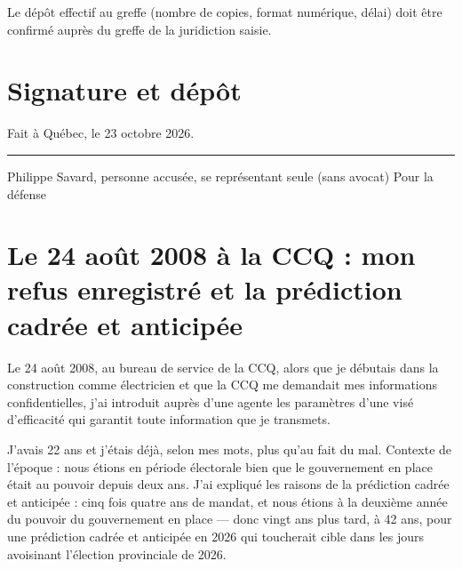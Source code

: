 \documentclass[12pt,a4paper]{article}
\begin{document}
Le dépôt effectif au greffe (nombre de copies, format numérique, délai) doit être confirmé auprès du greffe de la juridiction saisie.

\section{Signature et dépôt}
\vspace{1cm}
\begin{flushright}
Fait à Québec, le 23 octobre 2026.

\vspace{1.2cm}
\rule{6cm}{0.4pt}
Philippe Savard, personne accusée, se représentant seule (sans avocat)
Pour la défense
\end{flushright}

\section{Le 24 août 2008 à la CCQ : mon refus enregistré et la prédiction cadrée et anticipée}
Le 24 août 2008, au bureau de service de la CCQ, alors que je débutais dans
la construction comme électricien et que la CCQ me demandait mes informations
confidentielles, j'ai introduit auprès d'une agente les paramètres d'une visé
d'efficacité qui garantit toute information que je transmets.

J'avais 22 ans et j'étais déjà, selon mes mots, plus qu'au fait du mal.
Contexte de l'époque : nous étions en période électorale bien que le gouvernement en
place était au pouvoir depuis deux ans. J'ai expliqué les raisons de la prédiction
cadrée et anticipée : cinq fois quatre ans de mandat, et nous étions à la
deuxième année du pouvoir du gouvernement en place — donc vingt ans plus
tard, à 42 ans, pour une prédiction cadrée et anticipée en 2026 qui
toucherait cible dans les jours avoisinant l'élection provinciale de 2026.
\end{document}
